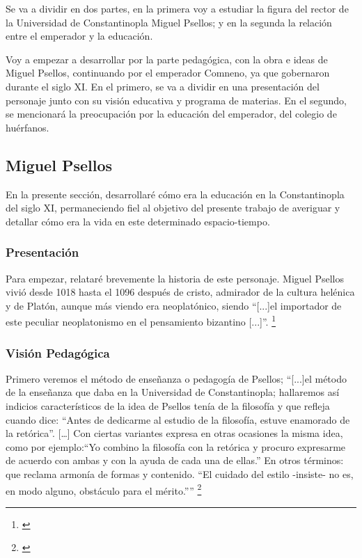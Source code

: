 

Se va a dividir en dos partes, en la primera voy a estudiar
la figura del rector de la Universidad de Constantinopla
Miguel Psellos; y en la segunda la relación entre el emperador y la
educación.

Voy a empezar a desarrollar por la parte pedagógica, con la obra e 
ideas de Miguel Psellos, continuando por el emperador Comneno, 
ya que gobernaron durante el siglo XI. En el primero, se va a dividir 
en una presentación del personaje junto con su visión educativa y 
programa de materias. En el segundo, se mencionará la preocupación por 
la educación del emperador, del colegio de huérfanos.

\subsection{Miguel Psellos}
En la presente sección, desarrollaré cómo era la educación en la 
Constantinopla del siglo XI, permaneciendo fiel al objetivo del 
presente trabajo de averiguar y detallar cómo era la vida en este 
determinado espacio-tiempo.

\subsubsection{Presentación}
Para empezar, relataré brevemente la historia de este personaje. 
Miguel Psellos vivió desde 1018 hasta el 1096 después de cristo, 
admirador de la cultura helénica y de Platón, aunque más viendo era 
neoplatónico, siendo “[...]el importador de este peculiar neoplatonismo 
en el pensamiento bizantino [...]”.
\footnote{\cite[p.~160]{filosofia}}

\subsubsection{Visión Pedagógica}
Primero veremos el método de enseñanza o pedagogía de Psellos; 
“[...]el método de la enseñanza que daba en la Universidad de 
Constantinopla; hallaremos así indicios característicos de la idea de 
Psellos tenía de la filosofía y que refleja cuando dice: 
“Antes de dedicarme al estudio de la filosofía, estuve enamorado de 
la retórica”. […] Con ciertas variantes expresa en otras ocasiones 
la misma idea, como por ejemplo:“Yo combino la filosofía con la 
retórica y procuro expresarme de acuerdo con ambas y con la ayuda de 
cada una de ellas.” En otros términos: que reclama armonía de 
formas y contenido. “El cuidado del estilo -insiste- no es, 
en modo alguno, obstáculo para el mérito.””
\footnote{\cite[p.~160]{filosofia}}

